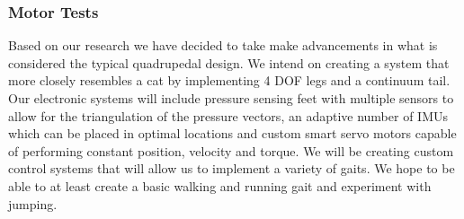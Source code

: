         \subsubsection{Motor Tests}



Based on our research we have decided to take make advancements in what is considered the typical quadrupedal design. We intend on creating a system that more closely resembles a cat by implementing 4 DOF legs and a continuum tail. Our electronic systems will include pressure sensing feet with multiple sensors to allow for the triangulation of the pressure vectors, an adaptive number of IMUs which can be placed in optimal locations and custom smart servo motors capable of performing constant position, velocity and torque. We will be creating custom control systems that will allow us to implement a variety of gaits. We hope to be able to at least create a basic walking and running gait and experiment with jumping.
